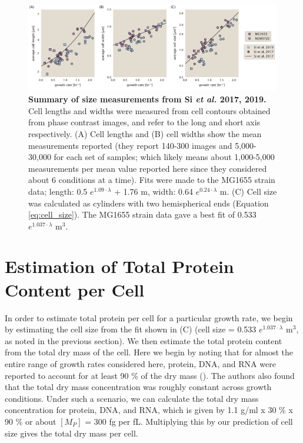 \begin{figure}
		\centering
    \includegraphics[width=1.0\textwidth]{SI_figs/Si_size_data_fit.pdf}
    \caption{\textbf{Summary of size measurements from Si \textit{et al.} 2017,
    2019.} Cell lengths and widths were measured from cell contours obtained from
    phase contrast images, and refer to the long and short axis respectively. (A)
    Cell lengths and (B) cell widths show the mean measurements reported (they
    report 140-300 images and 5,000-30,000 for each set of samples; which likely
    means about 1,000-5,000 measurements per mean value reported here since they
    considered about 6 conditions at a time). Fits were made to the  MG1655 strain
    data; length: 0.5 $e^{1.09 \cdot \lambda}$ + 1.76 \textmu m, width:  0.64
    $e^{0.24 \cdot \lambda}$ \textmu m. (C) Cell size was calculated as
    cylinders with two hemispherical ends (Equation \ref{eq:cell_size}). The
    MG1655 strain data gave a best fit of 0.533 $e^{1.037 \cdot \lambda}$ \textmu m$^3$.}
  \label{fig:final_size_data_Si}
\end{figure}


\section{Estimation of Total Protein Content per Cell}
\label{sec:estimate_protein_per_cell}
In order to estimate total protein per cell for a particular growth rate, we
begin by estimating the cell size from the fit shown in
(C) (cell size = 0.533 $e^{1.037 \cdot \lambda}$ \textmu m$^3$,
as noted in the previous section). We
then estimate the total protein content from the total dry mass of the cell.
Here we begin by noting that  for almost the entire range of growth rates
considered here, protein, DNA, and RNA were reported to account for at least 90
\% of the dry mass (\cite{basan2015}). The authors also found that the total dry
mass concentration was roughly constant across growth conditions. Under such a
scenario, we can calculate the total dry mass concentration for protein, DNA,
and RNA, which is given by 1.1 g/ml x 30 \% x 90 \% or about $[M_P]$ = 300 fg
per fL. Multiplying this by our prediction of cell size gives the total dry mass
per cell.

